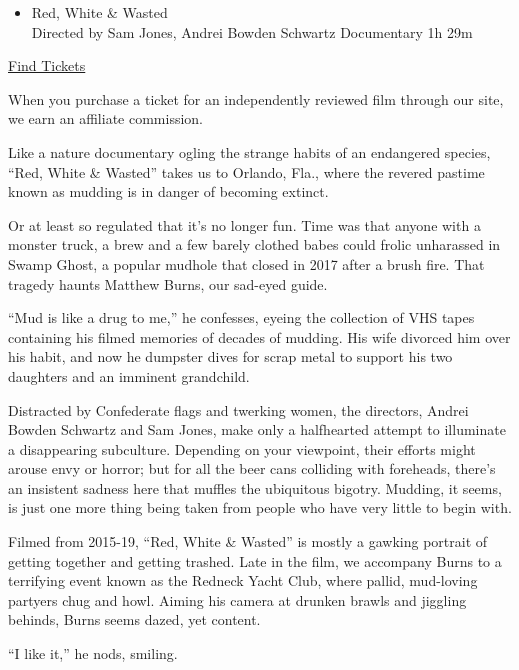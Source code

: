 \begin{itemize}
\tightlist
\item
  Red, White \& Wasted\\
  Directed by Sam Jones, Andrei Bowden Schwartz Documentary 1h 29m
\end{itemize}

\href{https://www.imdb.com/showtimes/title/tt10011362?ref_=ref_ext_NYT}{Find
Tickets}

When you purchase a ticket for an independently reviewed film through
our site, we earn an affiliate commission.

Like a nature documentary ogling the strange habits of an endangered
species, ``Red, White \& Wasted'' takes us to Orlando, Fla., where the
revered pastime known as mudding is in danger of becoming extinct.

Or at least so regulated that it's no longer fun. Time was that anyone
with a monster truck, a brew and a few barely clothed babes could frolic
unharassed in Swamp Ghost, a popular mudhole that closed in 2017 after a
brush fire. That tragedy haunts Matthew Burns, our sad-eyed guide.

``Mud is like a drug to me,'' he confesses, eyeing the collection of VHS
tapes containing his filmed memories of decades of mudding. His wife
divorced him over his habit, and now he dumpster dives for scrap metal
to support his two daughters and an imminent grandchild.

Distracted by Confederate flags and twerking women, the directors,
Andrei Bowden Schwartz and Sam Jones, make only a halfhearted attempt to
illuminate a disappearing subculture. Depending on your viewpoint, their
efforts might arouse envy or horror; but for all the beer cans colliding
with foreheads, there's an insistent sadness here that muffles the
ubiquitous bigotry. Mudding, it seems, is just one more thing being
taken from people who have very little to begin with.

Filmed from 2015-19, ``Red, White \& Wasted'' is mostly a gawking
portrait of getting together and getting trashed. Late in the film, we
accompany Burns to a terrifying event known as the Redneck Yacht Club,
where pallid, mud-loving partyers chug and howl. Aiming his camera at
drunken brawls and jiggling behinds, Burns seems dazed, yet content.

``I like it,'' he nods, smiling.

